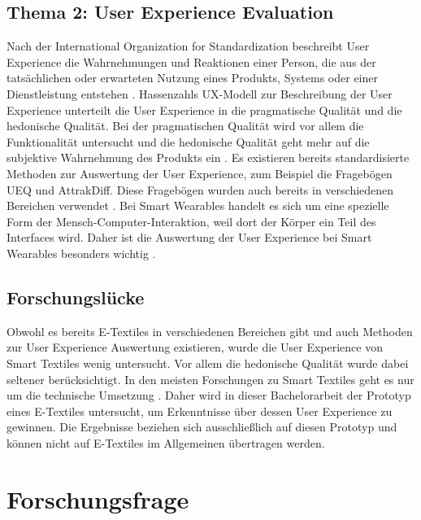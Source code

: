\documentclass[12pt, a4paper]{article}
\begin{document}
\subsection{Thema 2: User Experience Evaluation}

Nach der International Organization for Standardization beschreibt User Experience die Wahrnehmungen und Reaktionen einer Person, die aus der tatsächlichen oder erwarteten Nutzung eines Produkts, Systems oder einer Dienstleistung entstehen \parencite{iso9241-210}. Hassenzahls UX-Modell zur Beschreibung der User Experience unterteilt die User Experience in die pragmatische Qualität und die hedonische Qualität. Bei der pragmatischen Qualität wird vor allem die Funktionalität untersucht und die hedonische Qualität geht mehr auf die subjektive Wahrnehmung des Produkts ein \parencite{hassenzahl2007hedonic}. Es existieren bereits standardisierte Methoden zur Auswertung der User Experience, zum Beispiel die Fragebögen UEQ und AttrakDiff. Diese Fragebögen wurden auch bereits in verschiedenen Bereichen verwendet \parencite{diaz2019standardized}. Bei Smart Wearables handelt es sich um eine spezielle Form der Mensch-Computer-Interaktion, weil dort der Körper ein Teil des Interfaces wird. Daher ist die Auswertung der User Experience bei Smart Wearables besonders wichtig \parencite{guennes2025smart}.

\subsection{Forschungslücke}

Obwohl es bereits E-Textiles in verschiedenen Bereichen gibt und auch Methoden zur User Experience Auswertung existieren, wurde die User Experience von Smart Textiles wenig untersucht. Vor allem die hedonische Qualität wurde dabei seltener berücksichtigt. In den meisten Forschungen zu Smart Textiles geht es nur um die technische Umsetzung \parencite{guennes2025smart}. Daher wird in dieser Bachelorarbeit der Prototyp eines E-Textiles untersucht, um Erkenntnisse über dessen User Experience zu gewinnen. Die Ergebnisse beziehen sich ausschließlich auf diesen Prototyp und können nicht auf E-Textiles im Allgemeinen übertragen werden.

\section{Forschungsfrage}
\end{document}
